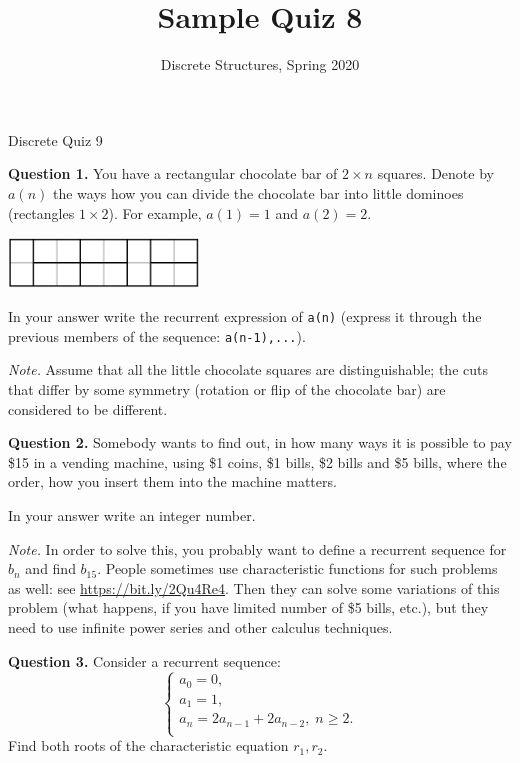 \documentclass[jou]{apa6}
\title{Sample Quiz 8}
\author{Discrete Structures, Spring 2020}
\affiliation{RBS}
\begin{document}
\thispagestyle{empty}

\twocolumn
{\Large Discrete Quiz 9}

\vspace{10pt}
{\bf Question 1.} 
You have a rectangular chocolate bar of $2 \times n$ squares. 
Denote by $a(n)$ the ways how you can divide the chocolate bar into 
little dominoes (rectangles $1 \times 2$). 
For example, $a(1) = 1$ and $a(2) = 2$. 
\begin{center}
\includegraphics[width=2in]{DominoTiling.png}
\end{center}

In your answer write the recurrent expression of {\tt a(n)} (express it through the previous members
of the sequence: {\tt a(n-1),...}).

{\em Note.} Assume that all the little
chocolate squares are distinguishable; the cuts that differ by 
some symmetry (rotation or flip of the chocolate bar) are considered to be different.


\vspace{10pt}
{\bf Question 2.}
Somebody wants to find out, in how many ways it is possible to pay \$15 in a vending machine, using 
\$1 coins, \$1 bills, \$2 bills and \$5 bills, where the order, how you insert them into the machine matters.

In your answer write an integer number.

{\em Note.} In order to solve this, you probably want to define a 
recurrent sequence for $b_n$ and 
find $b_{15}$. People sometimes use characteristic functions for such problems as well:
see \url{https://bit.ly/2Qu4Re4}. Then they can solve some variations of this
problem (what happens, if you have limited number of \$5 bills, etc.), but they need to use
infinite power series and other calculus techniques.

\vspace{10pt}
{\bf Question 3.}
Consider a recurrent sequence: 
$$\left\{ \begin{array}{l}
a_0 = 0,\\
a_1 = 1, \\
a_n = 2a_{n-1} + 2a_{n-2},\;n\geq 2.\\
\end{array} \right.$$
Find both roots of the characteristic equation $r_1,r_2$. 
\end{document}
